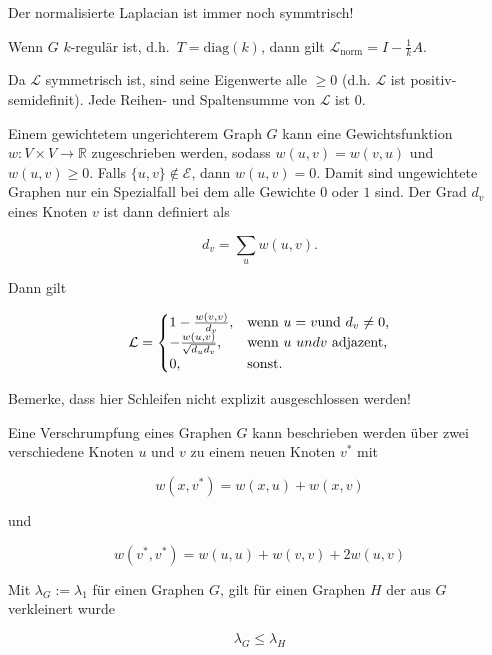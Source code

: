Der normalisierte Laplacian ist immer noch symmtrisch!

Wenn $G$ $k$-regulär ist, d.h.\ $T = \text{diag}(k)$, dann gilt $\mathcal{L}_{\text{norm}} = I - \frac{1}{k}A$.

Da $\mathcal{L}$ symmetrisch ist, sind seine Eigenwerte alle $\geq 0$ (d.h. $\mathcal{L}$ ist positiv-semidefinit).
Jede Reihen- und Spaltensumme von $\mathcal{L}$ ist $0$.

Einem gewichtetem ungerichterem Graph $G$ kann eine Gewichtsfunktion $w: V \times V \rightarrow \mathbb{R}$ zugeschrieben werden, sodass $w(u, v) = w(v, u)$ und $w(u, v) \geq 0$.
Falls $\lbrace u, v \rbrace \notin \mathcal{E}$, dann $w(u, v) = 0$.
Damit sind ungewichtete Graphen nur ein Spezialfall bei dem alle Gewichte $0$ oder $1$ sind.
Der Grad $d_v$ eines Knoten $v$ ist dann definiert als

\begin{equation}
  d_v = \sum_u w(u, v).
\end{equation}

Dann gilt

\begin{equation}
  \mathcal{L} = \begin{cases}
    1 - \frac{w(v, v)}{d_v}, & \text{wenn }u = v\text{und }d_v \neq 0\text{,}\\
    -\frac{w(u,v)}{\sqrt{d_u d_v}}, & \text{wenn }u\text\ {und }v\ \text{adjazent,}\\
    0, & \text{sonst.}
  \end{cases}
\end{equation}

Bemerke, dass hier Schleifen nicht explizit ausgeschlossen werden!

Eine Verschrumpfung eines Graphen $G$ kann beschrieben werden über zwei verschiedene Knoten $u$ und $v$ zu einem neuen Knoten $v^*$ mit

\begin{equation}
  w(x,v^*) = w(x, u) + w(x, v)
\end{equation}

und

\begin{equation}
  w(v^*, v^*) = w(u, u) + w(v, v) + 2w(u,v)
\end{equation}

Mit $\lambda_G := \lambda_1$ für einen Graphen $G$, gilt für einen Graphen $H$ der aus $G$ verkleinert wurde

\begin{equation}
  \lambda_G \leq \lambda_H
\end{equation}

